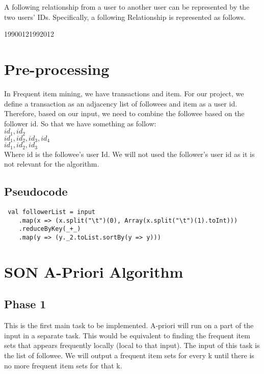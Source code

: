\documentclass[11pt]{article}
\begin{document}
A following relationship from a user to another user can be represented by the two users' IDs.
Specifically, a following Relationship is represented as follows.

1990012\hspace{1cm}1992012 \\

\newpage
\section{Pre-processing}
In Frequent item mining, we have transactions and item.
For our project, we define a transaction as an adjacency list of followees and item as a user id.
Therefore, based on our input, we need to combine the followee based on the follower id.
So that we have something as follow: \\

$id_1, id_2$ \\
$id_1, id_2, id_3, id_4$ \\
$id_1, id_2, id_3$ \\

Where id is the followee's user Id.
We will not used the follower's user id as it is not relevant for the algorithm.

\subsection{Pseudocode}

\begin{lstlisting}
 val followerList = input
    .map(x => (x.split("\t")(0), Array(x.split("\t")(1).toInt)))
    .reduceByKey(_+_)
    .map(y => (y._2.toList.sortBy(y => y)))
\end{lstlisting}

\section{SON A-Priori Algorithm}
\subsection{Phase 1}

This is the first main task to be implemented.
A-priori will run on a part of the input in a separate task.
This would be equivalent to finding the frequent item sets that appears frequently locally (local to that input).
The input of this task is the list of followee.
We will output a frequent item sets for every k until there is no more frequent item sets for that k.
\end{document}
